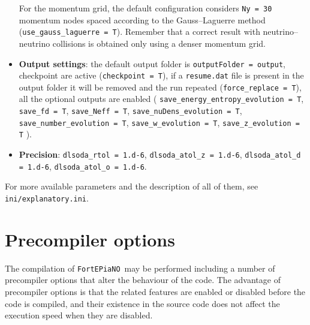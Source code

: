 \documentclass[notitlepage,nofootinbib,showpacs,preprintnumbers,amsmath,amssymb,superscriptaddress,prd,onecolumn]{revtex4-1}
\newcommand{\fortepiano}{\texttt{FortEPiaNO}}
\begin{document}
\begin{itemize}
For the momentum grid, the default configuration considers \texttt{Ny = 30} momentum nodes
spaced according to the Gauss--Laguerre method (\texttt{use\_gauss\_laguerre = T}).
Remember that a correct result with neutrino--neutrino collisions is obtained only using a denser momentum grid.
%
\item
\textbf{Output settings}:
the default output folder is \texttt{outputFolder = output},
checkpoint are active (\texttt{checkpoint = T}),
if a \texttt{resume.dat} file is present in the output folder it will be removed and the run repeated
(\texttt{force\_replace = T}),
all the optional outputs are enabled (%
\texttt{save\_energy\_entropy\_evolution = T},
\texttt{save\_fd = T},
\texttt{save\_Neff = T},
\texttt{save\_nuDens\_evolution = T},
\texttt{save\_number\_evolution = T},
\texttt{save\_w\_evolution = T},
\texttt{save\_z\_evolution = T}%
).
%
\item \textbf{Precision}:
\texttt{dlsoda\_rtol = 1.d-6},
\texttt{dlsoda\_atol\_z = 1.d-6},
\texttt{dlsoda\_atol\_d = 1.d-6},
\texttt{dlsoda\_atol\_o = 1.d-6}.
\end{itemize}
For more available parameters and the description of all of them, see \texttt{ini/explanatory.ini}.


\section{Precompiler options}
\label{ssec:precompiler}
The compilation of \fortepiano\ may be performed including a number of precompiler options
that alter the behaviour of the code.
The advantage of precompiler options is that the related features are enabled or disabled
before the code is compiled, and their existence in the source code
does not affect the execution speed when they are disabled.
\end{document}
